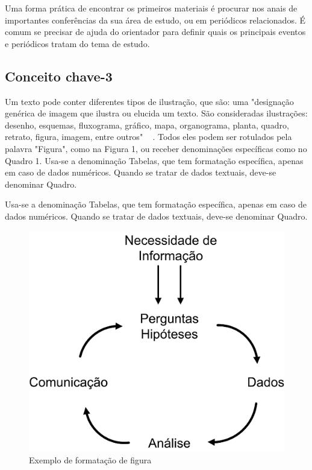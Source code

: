 Uma forma prática de encontrar os primeiros materiais é procurar nos anais de importantes conferências da sua área de estudo, ou em periódicos relacionados. É comum se precisar de ajuda do orientador para definir quais os principais eventos e periódicos tratam do tema de estudo.

\subsection{Conceito chave-3}

Um texto pode conter diferentes tipos de ilustração, que são: uma "designação genérica de imagem que ilustra ou elucida um texto. São consideradas ilustrações: desenho, esquemas, fluxograma, gráfico, mapa, organograma, planta, quadro, retrato, figura, imagem, entre outros" ~ \cite{ufc_guia}. Todos eles podem ser rotulados pela palavra "Figura", como na Figura 1, ou receber denominações específicas como no Quadro 1. 
Usa-se a denominação Tabelas, que tem formatação específica, apenas em caso de dados numéricos. Quando se tratar de dados textuais, deve-se denominar Quadro.

Usa-se a denominação Tabelas, que tem formatação específica, apenas em caso de dados numéricos. Quando se tratar de dados textuais, deve-se denominar Quadro.

\begin{figure}[H] %
	\caption{\label{fig:exemplo-1} Exemplo de formatação de figura}
	\begin{center}
	    \includegraphics[scale=0.2]{figuras/figura_1} %
	\end{center}
\end{figure}